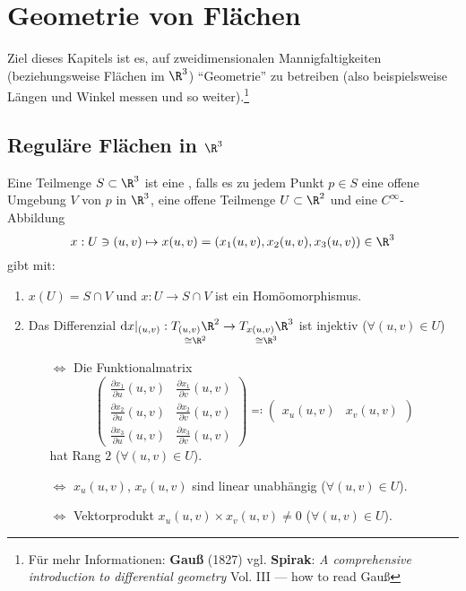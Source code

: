 \chapter{Geometrie von Flächen}

Ziel dieses Kapitels ist es, auf zweidimensionalen Mannigfaltigkeiten (beziehungsweise Flächen im \( \R^3 \)) ``Geometrie'' zu betreiben  (also beispielsweise Längen und Winkel messen und so weiter).\footnote{Für mehr Informationen: \textbf{Gauß} (1827) vgl. \textbf{Spirak}: \emph{A comprehensive introduction to differential geometry} Vol. III --- how to read Gauß}

\section{Reguläre Flächen in \( \R^3 \)}

\begin{remark}
  Eine Teilmenge \( S \subset \R^3 \) ist eine , falls es zu jedem Punkt \( p \in S \) eine offene Umgebung \( V \) von \( p \) in \( \R^3 \), eine offene Teilmenge \( U \subset \R^2 \) und eine \( C^\infty \)-Abbildung
  \begin{equation*}
    x: U \ni (u,v) \mapsto x(u,v) = \left( x_1(u,v),x_2(u,v),x_3(u,v) \right) \in \R^3
  \end{equation*}
  gibt mit:
  \begin{enumerate}
    \item \( x(U) = S \cap V \) und \( x: U \to S \cap V \) ist ein Homöomorphismus. 
    \item Das Differenzial \( \text{d}x|_{(u,v)}: \underset{\cong \R^2}{T_{(u,v)}\R^2} \to \underset{\cong \R^3}{T_{x(u,v)}\R^3} \) ist injektiv (\( \forall (u,v) \in U \))
    \begin{itemize}
      \item[\( \Leftrightarrow \)] Die Funktionalmatrix
        \begin{equation*}
          \begin{pmatrix}
            \frac{\partial x_1}{\partial u}(u,v) & \frac{\partial x_1}{\partial v}(u,v) \\
            \frac{\partial x_2}{\partial u}(u,v) & \frac{\partial x_2}{\partial v}(u,v) \\
            \frac{\partial x_3}{\partial u}(u,v) & \frac{\partial x_3}{\partial v}(u,v)
          \end{pmatrix} \eqqcolon \begin{pmatrix}
            x_u(u,v) & x_v(u,v)
          \end{pmatrix}
        \end{equation*}
        hat Rang \( 2 \) (\( \forall (u,v) \in U \)).
      \item[\( \Leftrightarrow \)] \( x_u(u,v) \), \( x_v(u,v) \) sind linear unabhängig (\( \forall (u,v) \in U \)).
      \item[\( \Leftrightarrow \)] Vektorprodukt \( x_u(u,v) \times x_v(u,v) \neq 0 \) (\( \forall (u,v) \in U \)).
    \end{itemize}
  \end{enumerate}
\end{remark}

